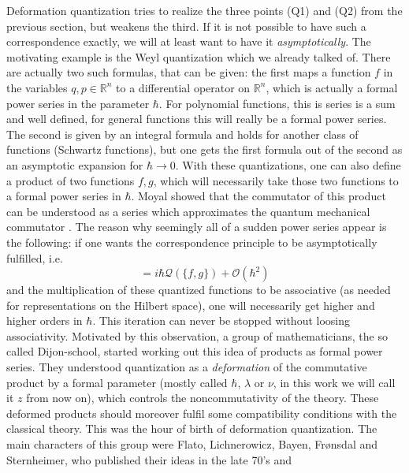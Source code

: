Deformation quantization tries to realize the three points (Q1) and (Q2) from the 
previous section, but weakens the third. If it is not possible to have such a 
correspondence exactly, we will at least want to have it 
\emph{asymptotically}. The motivating example is the Weyl quantization which we 
already talked of. There are actually two such formulas, that can be given: the 
first maps a function $f$ in the variables $q, p \in \mathbb{R}^n$ to a 
differential operator on $\mathbb{R}^n$, which is actually a formal power series 
in the parameter $\hbar$. For polynomial functions, this is series is a sum and 
well defined, for general functions this will really be a formal power series. 
The second is given by an integral formula and holds for another class of 
functions (Schwartz functions), but one gets the first formula out of the second 
as an asymptotic expansion for $\hbar \longrightarrow 0$. With these 
quantizations, one can also define a product of two functions $f, g$, which will 
necessarily take those two functions to a formal power series in $\hbar$. Moyal 
showed that the commutator of this product can be understood as a series which 
approximates the quantum mechanical commutator \cite{moyal:1949a}. The reason why 
seemingly all of a sudden power series appear is the following: if one wants the 
correspondence principle to be asymptotically fulfilled, i.e.
\begin{equation*}
	[\mathcal{Q}(f), \mathcal{g}]
	=
	i \hbar \mathcal{Q}(\{ f, g \})
	+ \mathcal{O}(\hbar^2)
\end{equation*}
and the multiplication of these quantized functions to be associative 
(as needed for representations on the Hilbert space), one will necessarily get 
higher and higher orders in $\hbar$. This iteration can never be stopped without 
loosing associativity. Motivated by this observation, a group of mathematicians, 
the so called Dijon-school, started working out this idea of products as formal 
power series. They understood quantization as a \emph{deformation} of the 
commutative product by a formal parameter (mostly called $\hbar$, $\lambda$ or 
$\nu$, in this work we will call it $z$ from now on), which controls the 
noncommutativity of the theory. These deformed products should moreover fulfil 
some compatibility conditions with the classical theory. This was the 
hour of birth of deformation quantization. The main characters of this group 
were Flato, Lichnerowicz, Bayen, Fr{\o}nsdal and Sternheimer, who published 
their ideas in the late 70's \cite{bayen.et.al:1977a, bayen.et.al:1978a} and 
